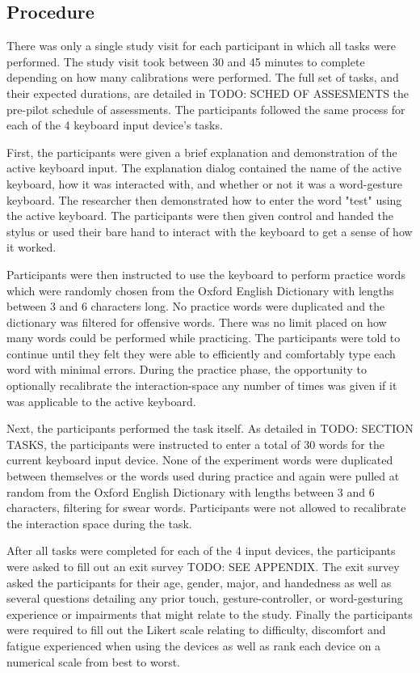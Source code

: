 \subsection{Procedure} \label{pre_procedure}
There was only a single study visit for each participant in which all tasks were performed. The study visit took between 30 and 45 minutes to complete depending on how many calibrations were performed. The full set of tasks, and their expected durations, are detailed in TODO: SCHED OF ASSESMENTS the pre-pilot schedule of assessments. The participants followed the same process for each of the 4 keyboard input device's tasks.

First, the participants were given a brief explanation and demonstration of the active keyboard input. The explanation dialog contained the name of the active keyboard, how it was interacted with, and whether or not it was a word-gesture keyboard. The researcher then demonstrated how to enter the word "test" using the active keyboard. The participants were then given control and handed the stylus or used their bare hand to interact with the keyboard to get a sense of how it worked.

Participants were then instructed to use the keyboard to perform practice words which were randomly chosen from the Oxford English Dictionary with lengths between 3 and 6 characters long. No practice words were duplicated and the dictionary was filtered for offensive words. There was no limit placed on how many words could be performed while practicing. The participants were told to continue until they felt they were able to efficiently and comfortably type each word with minimal errors. During the practice phase, the opportunity to optionally recalibrate the interaction-space any number of times was given if it was applicable to the active keyboard.

Next, the participants performed the task itself. As detailed in TODO: SECTION TASKS, the participants were instructed to enter a total of 30 words for the current keyboard input device. None of the experiment words were duplicated between themselves or the words used during practice and again were pulled at random from the Oxford English Dictionary with lengths between 3 and 6 characters, filtering for swear words. Participants were not allowed to recalibrate the interaction space during the task. 

After all tasks were completed for each of the 4 input devices, the participants were asked to fill out an exit survey TODO: SEE APPENDIX. The exit survey asked the participants for their age, gender, major, and handedness as well as several questions detailing any prior touch, gesture-controller, or word-gesturing experience or impairments that might relate to the study. Finally the participants were required to fill out the Likert scale relating to difficulty, discomfort and fatigue experienced when using the devices as well as rank each device on a numerical scale from best to worst.

